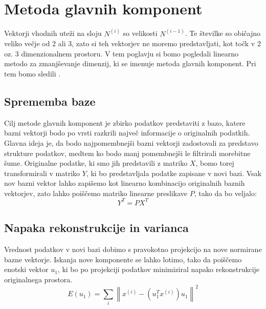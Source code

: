 \chapter{Metoda glavnih komponent}
Vektorji vhodnih uteži na sloju $N^{(i)}$ so velikosti $N^{(i - 1)}$. Te številke so običajno veliko večje od 2 ali 3, zato si teh vektorjev ne moremo predstavljati, kot točk v 2 oz. 3 dimenzionalnem prostoru. V tem poglavju si bomo pogledali linearno metodo za zmanjševanje dimenzij, ki se imenuje metoda glavnih komponent. Pri tem bomo sledili \cite{shlens2014tutorial}.

\section{Sprememba baze}
Cilj metode glavnih komponent je zbirko podatkov predstaviti z bazo, katere bazni vektorji bodo po vrsti razkrili največ informacije o originalnih podatkih. Glavna ideja je, da bodo najpomembnejši bazni vektorji zadostovali za predstavo strukture podatkov, medtem ko bodo manj pomembnejši le filtrirali morebitne šume. Originalne podatke, ki smo jih predstavili z matriko $X$, bomo torej transformirali v matriko $Y$, ki bo predstavljala podatke zapisane v novi bazi. Vsak nov bazni vektor lahko zapišemo kot linearno kombinacijo originalnih baznih vektorjev, zato lahko poiščemo matriko linearne preslikave $P$, tako da bo veljalo:
\begin{equation}
    Y^T = PX^T
\end{equation}

\section{Napaka rekonstrukcije in varianca}
Vrednost podatkov v novi bazi dobimo s pravokotno projekcijo na nove normirane bazne vektorje. Iskanja nove komponente se lahko lotimo, tako da poiščemo enotski vektor $u_1$, ki bo po projekciji podatkov minimiziral napako rekonstrukcije originalnega prostora.
\begin{equation}
E(u_1) = \sum_{i} \left\lVert x^{(i)} - (u_{1}^{T}{x}^{(i)})u_{1} \right\rVert^2
\end{equation}

